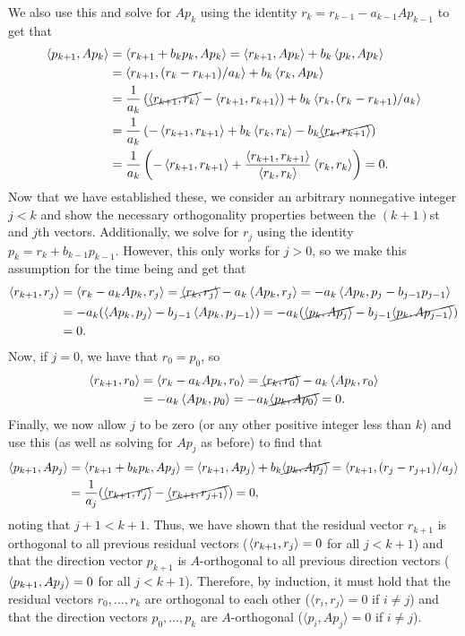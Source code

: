 \documentclass{article}
\begin{document}
We also use this and solve for $Ap_k$ using the identity $r_k = r_{k-1} - a_{k-1} A p_{k-1}$ to get that
\begin{align*}
\left \langle p_{k+1} , Ap_k \right \rangle&=\left \langle r_{k+1}+b_kp_k , Ap_k \right \rangle=\left \langle r_{k+1} , Ap_k \right \rangle+b_k\left \langle p_k , Ap_k \right \rangle\\&=
\left \langle r_{k+1} , (r_k-r_{k+1})/a_k \right \rangle+b_k\left \langle r_k , Ap_k \right \rangle\\&=
\frac{1}{a_k}\left(\cancel{\left \langle r_{k+1} , r_k \right \rangle}-\left \langle r_{k+1} , r_{k+1} \right \rangle\right)+b_k\left \langle r_k , (r_k-r_{k+1})/a_k \right \rangle\\&=
\frac{1}{a_k}\left(-\left \langle r_{k+1} , r_{k+1} \right \rangle+b_k\left \langle r_k , r_k \right \rangle-b_k\cancel{\left \langle r_k , r_{k+1} \right \rangle}\right)\\&=
\frac{1}{a_k}\left(-\left \langle r_{k+1} , r_{k+1} \right \rangle+\frac{\left \langle r_{k+1} , r_{k+1} \right \rangle}{\left \langle r_k , r_k \right \rangle}\left \langle r_k , r_k \right \rangle\right)=0.
\end{align*}
Now that we have established these, we consider an arbitrary nonnegative integer $j<k$ and show the necessary orthogonality properties between the $(k+1)$st and $j$th vectors. Additionally, we solve for $r_j$ using the identity $p_k = r_k + b_{k-1} p_{k-1}$. However, this only works for $j>0$, so we make this assumption for the time being and get that
\begin{align*}
\left \langle r_{k+1} , r_j \right \rangle&=\left \langle r_k-a_kAp_k , r_j \right \rangle=\cancel{\left \langle r_k , r_j \right \rangle}-a_k\left \langle Ap_k , r_j \right \rangle=-a_k\left \langle Ap_k , p_j-b_{j-1}p_{j-1} \right \rangle\\&=
-a_k(\left \langle Ap_k , p_j \right \rangle-b_{j-1}\left \langle Ap_k , p_{j-1} \right \rangle)=-a_k(\cancel{\left \langle p_k , Ap_j \right \rangle}-b_{j-1}\cancel{\left \langle p_k , Ap_{j-1} \right \rangle})\\&=0.
\end{align*}
Now, if $j=0$, we have that $r_0=p_0$, so
\begin{align*}
\left \langle r_{k+1} , r_0 \right \rangle&=\left \langle r_k-a_kAp_k , r_0 \right \rangle=\cancel{\left \langle r_k , r_0 \right \rangle}-a_k\left \langle Ap_k , r_0 \right \rangle\\&=
-a_k\left \langle Ap_k , p_0 \right \rangle=-a_k\cancel{\left \langle p_k , Ap_0 \right \rangle}=0.
\end{align*}
Finally, we now allow $j$ to be zero (or any other positive integer less than $k$) and use this (as well as solving for $Ap_j$ as before) to find that
\begin{align*}
\left \langle p_{k+1} , Ap_j \right \rangle&=\left \langle r_{k+1}+b_kp_k , Ap_j \right \rangle=\left \langle r_{k+1} , Ap_j \right \rangle+b_k\cancel{\left \langle p_k , Ap_j \right \rangle}=\left \langle r_{k+1} , (r_j-r_{j+1})/a_j \right \rangle\\&=
\frac{1}{a_j}(\cancel{\left \langle r_{k+1} , r_j \right \rangle}-\cancel{\left \langle r_{k+1} , r_{j+1} \right \rangle})=0,
\end{align*}
noting that $j+1<k+1$. Thus, we have shown that the residual vector $r_{k+1}$ is orthogonal to all previous residual vectors ($\left \langle r_{k+1} , r_j \right \rangle=0$ for all $j<k+1$) and that the direction vector $p_{k+1}$ is $A$-orthogonal to all previous direction vectors ($\left \langle p_{k+1} , Ap_j \right \rangle=0$ for all $j<k+1$). Therefore, by induction, it must hold that the residual vectors $r_0 , \ldots , r_k$ are orthogonal to each other
($\langle r_i , r_j \rangle = 0$ if $i \neq j$) and that the direction vectors 
$p_0 , \ldots , p_k$ are $A$-orthogonal ($\langle p_i , A p_j \rangle = 0$ if $i \neq j$).
\end{document}
